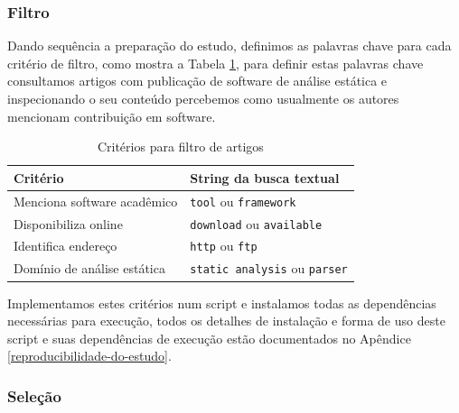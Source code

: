 \subsubsection{Filtro}


Dando sequência a preparação do estudo, definimos as palavras chave para cada
critério de filtro, como mostra a Tabela \ref{criterios-filtro}, para definir
estas palavras chave consultamos artigos com publicação de software de análise
estática e inspecionando o seu conteúdo percebemos como usualmente os
autores mencionam contribuição em software.


\begin{table}[h]
\caption{Critérios para filtro de artigos}
\centering
\begin{tabular}{ l l }
  \hline
  Critério                        & String da busca textual               \\
  \hline
  Menciona software acadêmico     & {\tt tool} ou {\tt framework}         \\
  Disponibiliza online            & {\tt download} ou {\tt available}     \\
  Identifica endereço             & {\tt http} ou {\tt ftp}               \\
  Domínio de análise estática     & {\tt static analysis} ou {\tt parser} \\
  \hline
\end{tabular}
\label{criterios-filtro}
\end{table}

Implementamos estes critérios num script e instalamos todas as dependências
necessárias para execução, todos os detalhes de instalação e forma de uso deste
script e suas dependências de execução estão documentados no Apêndice
\ref{reproducibilidade-do-estudo}.

\subsubsection{Seleção}

